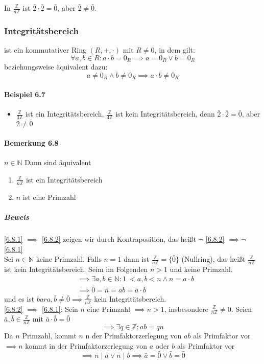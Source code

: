 \documentclass[a4paper]{scrartcl}
\DeclareMathOperator{\Forall}{\forall}
\theoremstyle{definition}
\theoremstyle{plain}
\theoremstyle{plain}
\theoremstyle{remark}
\theoremstyle{remark}
\theoremstyle{remark}
\theoremstyle{remark}
\theoremstyle{remark}
\begin{document}
In $\frac{\mathbb{Z}}{n\mathbb{Z}}$ ist $\bar 2 \cdot \bar 2 = \bar 0$, aber $\bar 2\neq \bar 0$.
\subsubsection{Integritätsbereich}
\label{sec-3-2-5}
\label{Definition-6.6}
ist ein kommutativer Ring $(R,+,\cdot)$ mit $R\neq 0$, in dem gilt:
\[\Forall a,b\in R: a\cdot b = 0_R \implies a = 0_R\vee b = 0_R\]
beziehungsweise äquivalent dazu:
\[a\neq 0_R \wedge b\neq 0_R \implies a\cdot b \neq 0_R\]
\paragraph{Beispiel 6.7}
\label{sec-3-2-5-1}
\begin{itemize}
\item $\frac{\mathbb{Z}}{3\mathbb{Z}}$ ist ein Integritätsbereich, $\frac{\mathbb{Z}}{4\mathbb{Z}}$ ist kein Integritätsbereich, denn $\bar 2\cdot \bar 2 = \bar 0$, aber $\bar 2 \neq \bar 0$
\end{itemize}
\paragraph{Bemerkung 6.8}
\label{sec-3-2-5-2}
$n\in\mathbb{N}$ Dann sind äquivalent
\begin{enumerate}
\item \label{6.8.1} $\frac{\mathbb{Z}}{n\mathbb{Z}}$ ist ein Integritätsbereich
\item \label{6.8.2} $n$ ist eine Primzahl
\end{enumerate}
\subparagraph{Beweis}
\label{sec-3-2-5-2-1}
\ref{6.8.1} $\implies$ \ref{6.8.2} zeigen wir durch Kontraposition, das heißt $\neg$ \ref{6.8.2} $\implies \neg$ \ref{6.8.1} \\
      Sei $n\in\mathbb{N}$ keine Primzahl. Falls $n = 1$ dann ist $\frac{\mathbb{Z}}{n\mathbb{Z}} = \{\bar 0\}$ (Nullring), das heißt $\frac{\mathbb{Z}}{n\mathbb{Z}}$ ist kein Integritätsbereich. Seim im Folgenden $n > 1$ und keine Primzahl.
\begin{align}
&\implies \exists a,b\in\mathbb{N}:1\ <a,b<n \wedge n = a\cdot b \\
&\implies \bar 0 = \bar n = \overline{a b} = \bar a \cdot \bar b
\end{align}
und es ist $bar a,\bar b\neq \bar 0 \implies \frac{\mathbb{Z}}{n\mathbb{Z}}$ kein Integritätsbereich. \\
      \ref{6.8.2} $\implies$ \ref{6.8.1}: Sein $n$ eine Primzahl $\implies n > 1$, insbesondere $\frac{\mathbb{Z}}{n\mathbb{Z}} \neq 0$. Seien $\bar a, \bar b \in \frac{\mathbb{Z}}{n\mathbb{Z}}$ mit $\bar a\cdot \bar b = \bar 0$
\[\implies \exists q\in\mathbb{Z}:a b = q n\]
Da $n$ Primzahl, kommt $n$ n der Primfaktorzerlegung von $a b$ als Primfaktor vor \\
      $\implies n$ kommt in der Primfaktorzerlegung von $a$ oder $b$ als Primfaktor vor \[\implies n\mid a \vee n\mid b \implies \bar a = \bar 0 \vee \bar b = \bar 0\]
\end{document}
